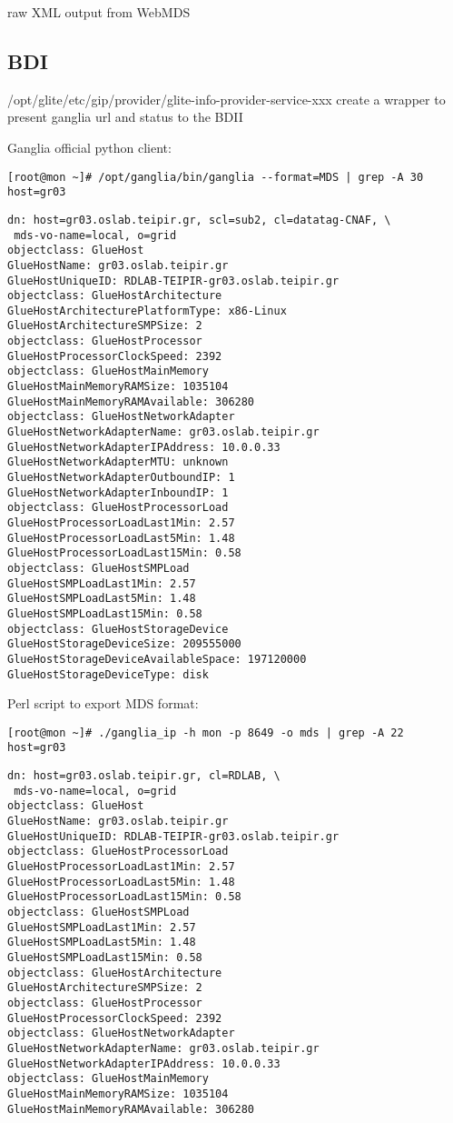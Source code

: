 raw XML output from WebMDS
\newpage

\subsection{BDI}
/opt/glite/etc/gip/provider/glite-info-provider-service-xxx
create a wrapper to present ganglia url and status to the BDII

Ganglia official python client:
\begin{verbatim}
[root@mon ~]# /opt/ganglia/bin/ganglia --format=MDS | grep -A 30 host=gr03
\end{verbatim}

\begin{lstlisting}
dn: host=gr03.oslab.teipir.gr, scl=sub2, cl=datatag-CNAF, \
 mds-vo-name=local, o=grid
objectclass: GlueHost
GlueHostName: gr03.oslab.teipir.gr
GlueHostUniqueID: RDLAB-TEIPIR-gr03.oslab.teipir.gr
objectclass: GlueHostArchitecture
GlueHostArchitecturePlatformType: x86-Linux
GlueHostArchitectureSMPSize: 2
objectclass: GlueHostProcessor
GlueHostProcessorClockSpeed: 2392
objectclass: GlueHostMainMemory
GlueHostMainMemoryRAMSize: 1035104
GlueHostMainMemoryRAMAvailable: 306280
objectclass: GlueHostNetworkAdapter
GlueHostNetworkAdapterName: gr03.oslab.teipir.gr
GlueHostNetworkAdapterIPAddress: 10.0.0.33
GlueHostNetworkAdapterMTU: unknown
GlueHostNetworkAdapterOutboundIP: 1
GlueHostNetworkAdapterInboundIP: 1
objectclass: GlueHostProcessorLoad
GlueHostProcessorLoadLast1Min: 2.57
GlueHostProcessorLoadLast5Min: 1.48
GlueHostProcessorLoadLast15Min: 0.58
objectclass: GlueHostSMPLoad
GlueHostSMPLoadLast1Min: 2.57
GlueHostSMPLoadLast5Min: 1.48
GlueHostSMPLoadLast15Min: 0.58
objectclass: GlueHostStorageDevice
GlueHostStorageDeviceSize: 209555000
GlueHostStorageDeviceAvailableSpace: 197120000
GlueHostStorageDeviceType: disk
\end{lstlisting}

Perl script to export MDS format:
\begin{verbatim}
[root@mon ~]# ./ganglia_ip -h mon -p 8649 -o mds | grep -A 22 host=gr03
\end{verbatim}
\begin{lstlisting}
dn: host=gr03.oslab.teipir.gr, cl=RDLAB, \
 mds-vo-name=local, o=grid
objectclass: GlueHost
GlueHostName: gr03.oslab.teipir.gr
GlueHostUniqueID: RDLAB-TEIPIR-gr03.oslab.teipir.gr
objectclass: GlueHostProcessorLoad
GlueHostProcessorLoadLast1Min: 2.57
GlueHostProcessorLoadLast5Min: 1.48
GlueHostProcessorLoadLast15Min: 0.58
objectclass: GlueHostSMPLoad
GlueHostSMPLoadLast1Min: 2.57
GlueHostSMPLoadLast5Min: 1.48
GlueHostSMPLoadLast15Min: 0.58
objectclass: GlueHostArchitecture
GlueHostArchitectureSMPSize: 2
objectclass: GlueHostProcessor
GlueHostProcessorClockSpeed: 2392
objectclass: GlueHostNetworkAdapter
GlueHostNetworkAdapterName: gr03.oslab.teipir.gr
GlueHostNetworkAdapterIPAddress: 10.0.0.33
objectclass: GlueHostMainMemory
GlueHostMainMemoryRAMSize: 1035104
GlueHostMainMemoryRAMAvailable: 306280
\end{lstlisting}

